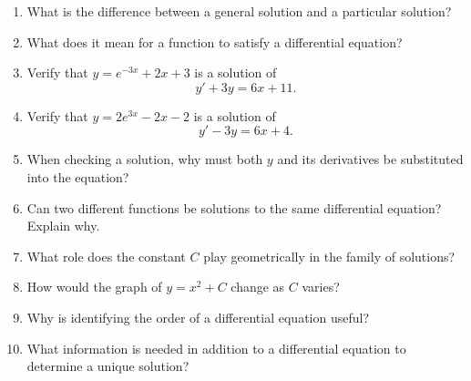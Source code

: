 \begin{enumerate}
  \item What is the difference between a general solution and a particular solution?
  \item What does it mean for a function to satisfy a differential equation?
  \item Verify that \(y = e^{-3x}+ 2x + 3\) is a solution of
    \[ y' + 3y = 6x + 11. \]
  \item Verify that \(y = 2e^{3x}- 2x - 2\) is a solution of
    \[ y' - 3y = 6x + 4. \]
  \item When checking a solution, why must both \(y\) and its derivatives be substituted into the equation?
  \item Can two different functions be solutions to the same differential equation? Explain why.
  \item What role does the constant \(C\) play geometrically in the family of solutions?
  \item How would the graph of \(y = x^{2} + C\) change as \(C\) varies?
  \item Why is identifying the order of a differential equation useful?
  \item What information is needed in addition to a differential equation to determine a unique solution?
\end{enumerate}
